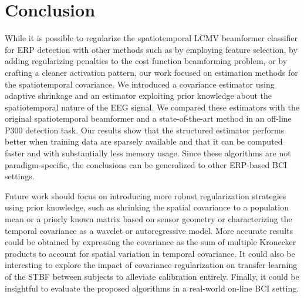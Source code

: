 	\section{Conclusion}
	While it is possible to regularize the spatiotemporal LCMV beamformer
	classifier for ERP detection with other methods such as by employing feature selection,
	by adding regularizing penalties to the cost
	function beamforming problem, or by crafting a cleaner activation pattern, our work focused on
	estimation methods for the spatiotemporal covariance.
	We introduced a covariance estimator using adaptive shrinkage and an
	estimator exploiting prior knowledge about the spatiotemporal nature of the EEG
	signal.
	We compared these estimators with the original spatiotemporal
	beamformer and a state-of-the-art method in an off-line P300 detection task.
	Our results show that the structured estimator performs better when training data are sparsely available and that it can be computed faster and with substantially less memory usage.
	Since these algorithms are not paradigm-specific,  the conclusions can be generalized to
	other ERP-based BCI settings.

	Future work should focus on introducing more robust regularization strategies using prior knowledge, such as shrinking the spatial covariance to a population mean or a priorly known matrix based on sensor geometry or characterizing the temporal covariance as a wavelet or autoregressive model.
	More accurate results could be obtained by expressing the covariance as the sum of multiple Kronecker products to account for spatial variation in temporal
	covariance.
	It could also be interesting to explore the impact of covariance regularization on transfer learning of the STBF between subjects to alleviate calibration entirely.
	Finally, it could be insightful to evaluate the proposed algorithms in a
	real-world on-line BCI setting.


